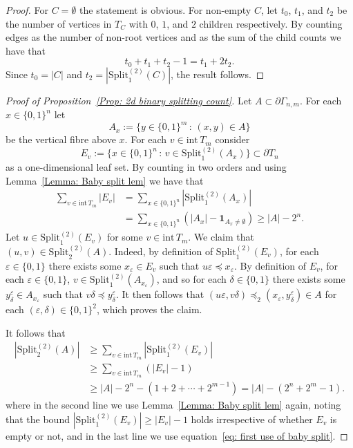 \documentclass[11pt]{amsart}
\newcommand\labs[1]{\left\lvert#1\right\rvert}
\newcommand{\Split}{\mathrm{Split}}
\newcommand{\inte}{\mathrm{int}\,}
\renewcommand{\geq}{\geqslant}
\theoremstyle{plain}
\theoremstyle{definition}
\theoremstyle{remark}
\begin{document}
\begin{proof}
For $C=\emptyset$ the statement is obvious. For non-empty $C$, let $t_0$, $t_1$, and $t_2$ be the number of vertices in $T_C$ with $0$, $1$, and $2$ children respectively. By counting edges as the number of non-root vertices and as the sum of the child counts we have that
\[ t_0 + t_1 +t_2 -1 = t_1 + 2 t_2.\] 
Since $t_0 = \labs{C}$ and $t_2 = \labs{\Split_1^{(2)}(C)}$, the result follows.
\end{proof}
\begin{proof}[Proof of Proposition~\ref{Prop: 2d binary splitting count}]
Let $A\subset \partial \Gamma_{n,m}$. For each $x \in \{0,1\}^n$ let
\[ A_x:= \{y \in \{0,1\}^m \, : \, (x,y) \in A\}\]
be the vertical fibre above $x$. For each $v \in \inte T_m$ consider
\[ E_v:= \{ x \in \{0,1\}^n \, : \, v \in \Split_1^{(2)}(A_x)\} \subset \partial T_n\]
as a one-dimensional leaf set. By counting in two orders and using Lemma~\ref{Lemma: Baby split lem} we have that
\begin{align} 
\sum_{v\in \inte T_m} \labs{E_v} &= \sum_{x\in \{0,1\}^n} \labs{\Split_1^{(2)}(A_x)} \nonumber \\
&= \sum_{x\in \{0,1\}^n} \left( \labs{A_x} - \mathbf{1}_{A_x \neq \emptyset}\right)\label{eq: first use of baby split}
\geq \labs{A} - 2^n.
\end{align}
Let $u \in \Split_1^{(2)}(E_v)$ for some $v\in \inte T_m$. We claim that $(u,v) \in \Split_2^{(2)}(A)$.
Indeed, by definition of $\Split_1^{(2)}(E_v)$, for each $\varepsilon \in \{0,1\}$ there exists some $x_\varepsilon \in E_v$ such that $u\varepsilon \preceq x_\varepsilon$. By definition of $E_v$, for each $\varepsilon \in \{0,1\}$, $v \in \Split_1^{(2)}(A_{x_\varepsilon})$, and so for each $\delta \in \{0,1\}$ there exists some $y_{\delta}^{\varepsilon} \in A_{x_\varepsilon}$ such that $v\delta \preceq y_{\delta}^{\varepsilon}$. It then follows that $(u\varepsilon,v\delta) \preceq_2 (x_\varepsilon,y_{\delta}^\varepsilon) \in A$ for each $(\varepsilon,\delta )\in \{0,1\}^2$, which proves the claim.

It follows that
\begin{align*}
\labs{\Split_2^{(2)}(A)} &\geq \sum_{v\in  \inte T_m} \labs{\Split_1^{(2)}(E_v)}\\
&\geq\sum_{v\in \inte T_m} \left(\labs{E_v}-1\right)\\
&\geq \labs{A}-2^n - (1+2+\cdots+2^{m-1}) = \labs{A} - (2^n + 2^m-1).
\end{align*}
where in the second line we use Lemma~\ref{Lemma: Baby split lem} again, noting that the bound $\labs{\Split_1^{(2)}(E_v) }\geq \labs{E_v}-1$ holds irrespective of whether $E_v$ is empty or not, and in the last line we use equation~\eqref{eq: first use of baby split}.
\end{proof}
\end{document}
